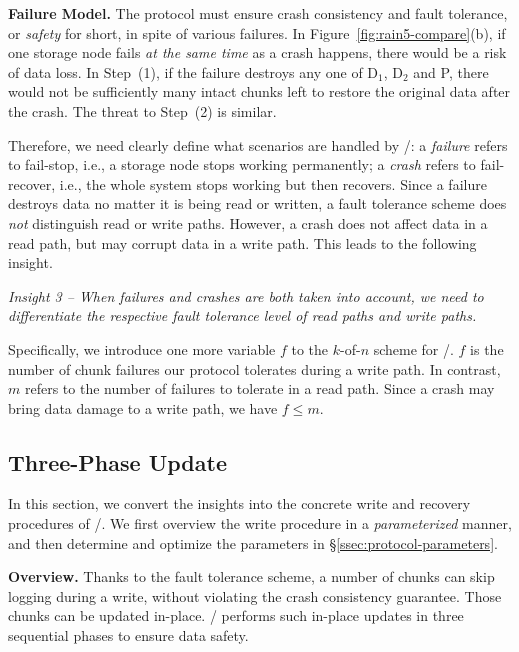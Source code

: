 \noindent
\textbf{Failure Model.}
The protocol must ensure crash consistency and fault tolerance, or
\emph{safety} for short, in spite of various failures.
In Figure~\ref{fig:rain5-compare}(b), if
one storage node fails \emph{at the same time} as a crash happens,
there would be a risk of data loss. In
Step~(1), if the failure destroys any one of D$_1$, D$_2$ and P,
there would not be sufficiently many intact chunks left to restore the original data after
the crash. The threat to Step~(2) is similar.

Therefore, we need clearly define what scenarios are handled by \protocol/:
a \emph{failure} refers to fail-stop, i.e., a storage node
stops working permanently; a \emph{crash} refers to fail-recover, i.e., the
whole system stops working but then recovers.
Since a failure destroys data no matter it is being read or written,
a fault tolerance scheme does \emph{not} distinguish read or write paths.
However, a crash does not affect data in a read path,
but may corrupt data in a write path.
This leads to the following insight.

\emph{
Insight 3 -- When failures and crashes are both taken into account,
we need to differentiate the respective fault tolerance level of read paths and write paths.
}

Specifically, we introduce one more variable $f$
to the $k$-of-$n$ scheme for \protocol/. $f$ is the number of chunk failures our
protocol tolerates during a write path. In contrast, $m$ refers to the number
of failures to tolerate in a read path. Since a crash may bring data damage to a write path, we have $f \le m$.

\vspace{-1em}
\subsection{Three-Phase Update}
\vspace{-0.5em}
\label{ssec:protocol-3pu}

In this section, we convert the insights into the concrete write and recovery procedures of \protocol/.
We first overview the write procedure in a \emph{parameterized}
manner, and then determine and optimize the parameters in
\S\ref{ssec:protocol-parameters}.

\noindent
\textbf{Overview.} Thanks to the fault tolerance scheme, a number of chunks can skip
logging during a write, without violating the crash consistency guarantee.
Those chunks can be updated in-place. \protocol/ performs such in-place updates
in three sequential phases to ensure data safety.


